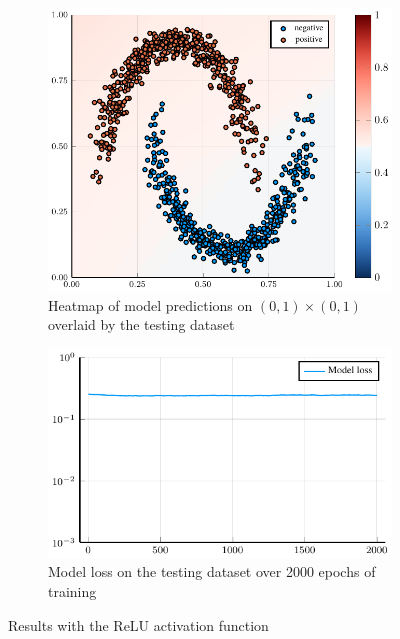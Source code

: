 \begin{figure}
	\centering
	\begin{subfigure}{0.49\textwidth}
		\centering
		\includegraphics[width=\textwidth]{images/relu-heatmap/relu.pdf}
		\caption{Heatmap of model predictions on \( \left( 0, 1 \right) \times \left( 0, 1 \right) \) overlaid by the testing dataset}
	\end{subfigure}
	\begin{subfigure}{0.49\textwidth}
		\centering
		\includegraphics[width=\textwidth]{images/relu-modelloss/relu.pdf}
		\caption{Model loss on the testing dataset over 2000 epochs of training}
	\end{subfigure}
	\caption{Results with the ReLU activation function}\label{relu}
\end{figure}

